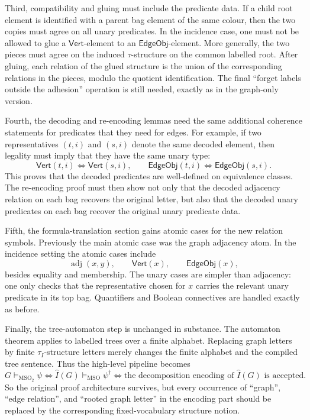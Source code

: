 \documentclass[11pt]{article}
\newcommand{\MSO}{\ensuremath{\mathrm{MSO}}}
\newcommand{\MSOtwo}{\ensuremath{\mathrm{MSO}_2}}
\begin{document}
Third, compatibility and gluing must include the predicate data.  If a child
root element is identified with a parent bag element of the same colour, then
the two copies must agree on all unary predicates.  In the incidence case, one
must not be allowed to glue a \(\mathsf{Vert}\)-element to an
\(\mathsf{EdgeObj}\)-element.  More generally, the two pieces must agree on the
induced \(\tau\)-structure on the common labelled root.  After gluing, each
relation of the glued structure is the union of the corresponding relations in
the pieces, modulo the quotient identification.  The final ``forget labels
outside the adhesion'' operation is still needed, exactly as in the graph-only
version.

Fourth, the decoding and re-encoding lemmas need the same additional coherence
statements for predicates that they need for edges.  For example, if two
representatives \((t,i)\) and \((s,i)\) denote the same decoded element, then
legality must imply that they have the same unary type:
\[
  \mathsf{Vert}(t,i)\Longleftrightarrow\mathsf{Vert}(s,i),
  \qquad
  \mathsf{EdgeObj}(t,i)\Longleftrightarrow\mathsf{EdgeObj}(s,i).
\]
This proves that the decoded predicates are well-defined on equivalence
classes.  The re-encoding proof must then show not only that the decoded
adjacency relation on each bag recovers the original letter, but also that the
decoded unary predicates on each bag recover the original unary predicate data.

Fifth, the formula-translation section gains atomic cases for the new relation
symbols.  Previously the main atomic case was the graph adjacency atom.  In the
incidence setting the atomic cases include
\[
  \operatorname{adj}(x,y),\qquad
  \mathsf{Vert}(x),\qquad
  \mathsf{EdgeObj}(x),
\]
besides equality and membership.  The unary cases are simpler than adjacency:
one only checks that the representative chosen for \(x\) carries the relevant
unary predicate in its top bag.  Quantifiers and Boolean connectives are handled
exactly as before.

Finally, the tree-automaton step is unchanged in substance.  The automaton
theorem applies to labelled trees over a finite alphabet.  Replacing graph
letters by finite \(\tau_I\)-structure letters merely changes the finite
alphabet and the compiled tree sentence.  Thus the high-level pipeline becomes
\[
  G\models_{\MSOtwo}\psi
  \Longleftrightarrow
  \widehat I(G)\models_{\MSO}\psi^\dagger
  \Longleftrightarrow
  \text{the decomposition encoding of }\widehat I(G)\text{ is accepted.}
\]
So the original proof architecture survives, but every occurrence of
``graph'', ``edge relation'', and ``rooted graph letter'' in the encoding part
should be replaced by the corresponding fixed-vocabulary structure notion.
\end{document}
